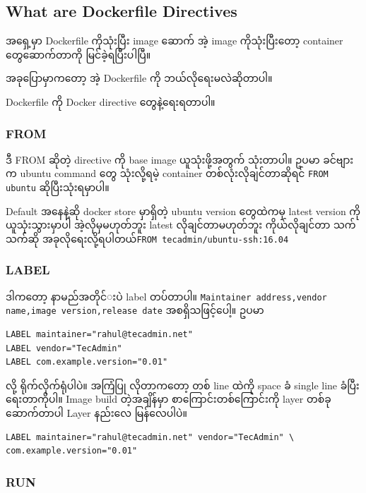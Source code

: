 \documentclass{article}
\begin{document}
\subsection{What are Dockerfile
Directives}\label{what-are-dockerfile-directives}

အ​ရှေ့မှာ Dockerfile ကိုသုံးပြီး image ​ဆောက်​ အဲ့ image
ကိုသုံးပြီး​တော့ container ​တွေ ​ဆောက်​တာကို မြင်​ခဲ့ရပြီးပါပြီ။

အခု​ပြောမှာက​တော့ အဲ့ Dockerfile ကို ဘယ်​လို​ရေးမလဲဆိုတာပါ။

Dockerfile ကို Docker directive ​တွေနဲ့​ရေးရတာပါ။

\subsubsection{FROM}\label{from}

ဒီ FROM ဆိုတဲ့ directive ကို base image ယူသုံးဖို့အတွက်​ သုံးတာပါ။ ဥပမာ
ခင်​​ဗျားက ubuntu command ​တွေ သုံးလို့ရမဲ့ container
တစ်​လုံးလိုချင်​တာဆိုရင်​ \texttt{FROM ubuntu} ဆိုပြီးသုံးရမှာပါ။

Default အ​နေနဲ့ဆို docker store မှာရှိတဲ့ ubuntu version ​တွေထဲကမှ
latest version ကို ယူသုံးသွားမှာပါ အဲ့လိုမှမဟုတ်​ဘူး latest
လိုချင်​တာမဟုတ်​ဘူး ကိုယ်​လိုချင်​တာ သက်​သက်​ဆို အခုလို​ရေးလို့ရပါတယ်​
\texttt{FROM tecadmin/ubuntu-ssh:16.04}

\subsubsection{LABEL}\label{label}

ဒါက​တော့ နာမည်​အတိုင်​းပဲ label တပ်​တာပါ။
\texttt{Maintainer addres​s,vendor name,image version,release date}
အစရှိသဖြင့်​ပေါ့။ ဥပမာ

\begin{verbatim}
LABEL maintainer="rahul@tecadmin.net"
LABEL vendor="TecAdmin"
LABEL com.example.version="0.01"
\end{verbatim}

လို့ ရိုက်​လိုက်​ရုံပါပဲ။ အကြံပြု လိုတာက​တော့ တစ်​ line ထဲကို space ခံ
single line ခံပြီး ​ရေးတာကိုပါ။ Image build တဲ့အချိန်​မှာ
စာ​ကြောင်းတစ်​​ကြောင်းကို layer တစ်​ခု ​ဆောက်​တာပါ Layer နည်း​လေ
မြန်​​လေပါပဲ။

\begin{verbatim}
LABEL maintainer="rahul@tecadmin.net" vendor="TecAdmin" \
com.example.version="0.01"
\end{verbatim}

\subsubsection{RUN}\label{run}
\end{document}
